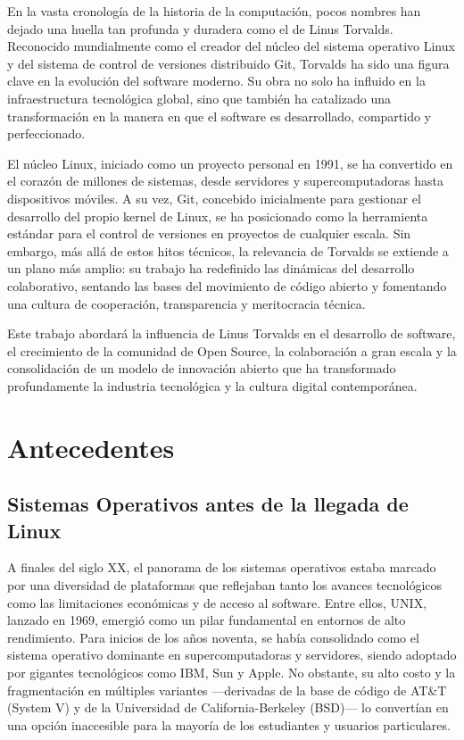 \documentclass[a4paper,12pt]{article}
\begin{document}
En la vasta cronología de la historia de la computación, pocos nombres han
dejado una huella tan profunda y duradera como el de Linus Torvalds. Reconocido
mundialmente como el creador del núcleo del sistema operativo Linux y del
sistema de control de versiones distribuido Git, Torvalds ha sido una figura
clave en la evolución del software moderno. Su obra no solo ha influido en la
infraestructura tecnológica global, sino que también ha catalizado una
transformación en la manera en que el software es desarrollado, compartido y
perfeccionado.

El núcleo Linux, iniciado como un proyecto personal en 1991, se ha convertido en
el corazón de millones de sistemas, desde servidores y supercomputadoras hasta
dispositivos móviles. A su vez, Git, concebido inicialmente para gestionar el
desarrollo del propio kernel de Linux, se ha posicionado como la herramienta
estándar para el control de versiones en proyectos de cualquier escala. Sin
embargo, más allá de estos hitos técnicos, la relevancia de Torvalds se extiende
a un plano más amplio: su trabajo ha redefinido las dinámicas del desarrollo
colaborativo, sentando las bases del movimiento de código abierto y fomentando
una cultura de cooperación, transparencia y meritocracia técnica.

Este trabajo abordará la influencia de Linus Torvalds en el desarrollo de
software, el crecimiento de la comunidad de Open Source, la colaboración a gran
escala y la consolidación de un modelo de innovación abierto que ha transformado
profundamente la industria tecnológica y la cultura digital contemporánea.  
\newpage

\section{Antecedentes} 

\subsection{Sistemas Operativos antes de la llegada de Linux}
A finales del siglo XX, el panorama de los sistemas operativos estaba marcado
por una diversidad de plataformas que reflejaban tanto los avances tecnológicos
como las limitaciones económicas y de acceso al software. Entre ellos, UNIX,
lanzado en 1969, emergió como un pilar fundamental en entornos de alto
rendimiento. Para inicios de los años noventa, se había consolidado como el
sistema operativo dominante en supercomputadoras y servidores, siendo adoptado
por gigantes tecnológicos como IBM, Sun y Apple. No obstante, su alto costo y la
fragmentación en múltiples variantes —derivadas de la base de código de AT\&T
(System V) y de la Universidad de California-Berkeley (BSD)— lo convertían en
una opción inaccesible para la mayoría de los estudiantes y usuarios
particulares.
\end{document}
